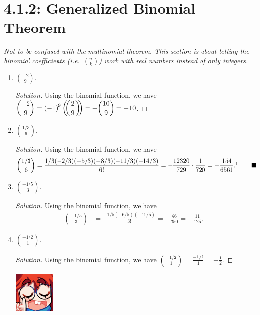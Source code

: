 \documentclass{article}
\newcommand{\multibinom}[2]{
  \left(\!\!\middle(\genfrac{}{}{0pt}{}{#1}{#2}\middle)\!\!\right)} %
\newenvironment{solution}
  {\renewcommand\qedsymbol{$\blacksquare$}\begin{proof}[Solution]}
  {\end{proof}}
\begin{document}
\section*{4.1.2: Generalized Binomial Theorem} 
\textit{Not to be confused with the multinomial theorem. This section is about letting the binomial coefficients (i.e.\ $\binom{n}{k}$) work 
with real numbers instead of only integers.} 
\begin{enumerate} 
    \item $\displaystyle\binom{-2}{9}$.\begin{solution}
        Using the binomial function, we have $\displaystyle{} \binom{-2}{9} = {(-1)}^9 \multibinom{2}{9} = -\binom{10}{9} = -10$.
    \end{solution} 
    \item $\displaystyle\binom{1/3}{6}$.\par
    \textit{Solution.} Using the binomial function, we have\begin{align*} 
        \binom{1/3}{6} &= \frac{1/3(-2/3)(-5/3)(-8/3)(-11/3)(-14/3)}{6!} = - \frac{12320}{729} \cdot \frac{1}{720} = - \frac{154}{6561}.\footnotemark \tag*{$\blacksquare$}
    \end{align*} 
    \item $\displaystyle\binom{-1/5}{3}$.\par 
    \textit{Solution.} Using the binomial function, we have\begin{align*} 
        \binom{-1/5}{3} &= \frac{-1/5(-6/5)(-11/5)}{3!} = -\frac{66}{750} = -\frac{11}{125}. \tag*{$\blacksquare$}
    \end{align*}
    \item $\displaystyle\binom{-1/2}{1}$.\begin{solution}
        Using the binomial function, we have $\displaystyle{} \binom{-1/2}{1} = \frac{-1/2}{1} = -\frac{1}{2}$. 
    \end{solution}
        \begin{minipage}[t]{.14\textwidth}
        \vspace{0pt}
        \includegraphics[width=2cm]{nerd_maddy.png} 
    \end{minipage}%

\end{enumerate}
\end{document}
